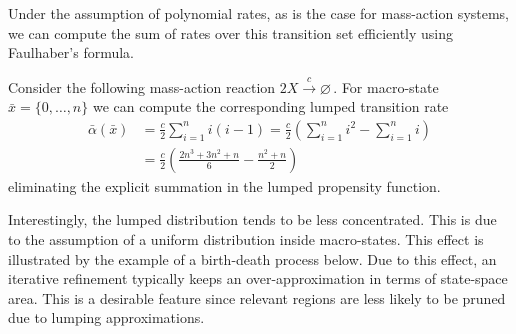 Under the assumption of polynomial rates, as is the case for mass-action
systems, we can compute the sum of rates over this transition set
efficiently using Faulhaber's formula.
\begin{example}
  Consider the following mass-action reaction
  $ 2 X \xrightarrow{c} \varnothing\,. $
  For macro-state
  $\bar{x} = \{0, \dots, n\}$
  we can compute the corresponding lumped transition rate
  \begin{align*}
    \bar{\alpha}(\bar{x})
    & =\frac{c}{2}\sum_{i=1}^n i (i - 1)
    =\frac{c}{2}\left(\sum_{i=1}^n i^2 - \sum_{i=1}^ni\right)\\
    & =\frac{c}{2}\left(\frac{2n^3+3n^2+n}{6} - \frac{n^2 + n}{2}\right)
  \end{align*}
  eliminating the explicit summation in the lumped propensity function.
\end{example}

Interestingly, the lumped distribution
tends to be less concentrated. %
This is due to the assumption of a
uniform distribution inside macro-states.
This effect is illustrated by the example of a birth-death process below.
Due to this effect, an iterative refinement typically keeps an
over-approximation in terms of state-space area.
This is a desirable feature since relevant regions are less likely to
be pruned due to lumping approximations.

